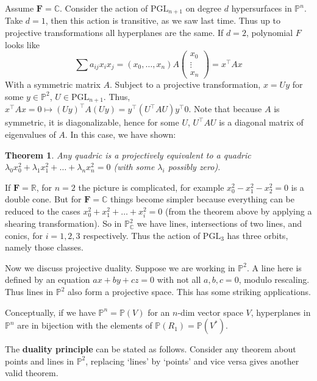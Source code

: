 \documentclass[12pt]{article}
\newcommand{\F}{\mathbf{F}}
\newcommand{\C}{\mathbb{C}}
\newcommand{\R}{\mathbb{R}}
\renewcommand{\P}{\mathbb{P}}
\newcommand{\PGL}{\mathrm{PGL}}
\newtheorem{theorem}{Theorem}[section]
\begin{document}
    Assume $\F = \C$. Consider  the action of $\PGL_{n+1}$ on degree $d$ hypersurfaces in $\P^n$. Take $d = 1$, then this action is transitive, as we saw last time. Thus up to projective transformations all hyperplanes are the same. If $d = 2$, polynomial $F$ looks like
    $$\sum a_{ij} x_i x_j = (x_0, \dots, x_n) A \begin{pmatrix}
        x_0 \\
        \vdots \\
        x_n
    \end{pmatrix} = x^\top A x$$
    With a symmetric matrix $A$. Subject to a projective transformation, $x = Uy$ for some $y \in \P^2$, $U \in \PGL_{n+1}$. Thus, $x^\top A x = 0 \mapsto (Uy)^\top A (Uy) = y^\top (U^\top A U) y^\top 0$. Note that because $A$ is symmetric, it is diagonalizable, hence for some $U$, $U^\top A U$ is a diagonal matrix of eigenvalues of $A$. In this case, we have shown:
    \begin{theorem}
        Any quadric is a projectively equivalent to a quadric $\lambda_0x_0^2 + \lambda_1x_1^2 + \dots + \lambda_nx_n^2 = 0$ (with some $\lambda_i$ possibly zero).
    \end{theorem}
    If $\F = \R$, for $n = 2$ the picture is complicated, for example $x_0^2 - x_1^2 - x_2^2 = 0$ is a double cone. But for $\F = \C$ things become simpler because everything can be reduced to the cases $x_0^2 + x_1^2 + \dots + x_i^2 = 0$ (from the theorem above by applying a shearing transformation). So in $\P_\C^2$ we have lines, intersections of two lines, and conics, for $i = 1, 2, 3$ respectively. Thus the action of $\PGL_3$ has three orbits, namely those classes. \par
    Now we discuss projective duality. Suppose we are working in $\P^2$. A line here is defined by an equation $ax + by + cz = 0$ with not all $a, b, c = 0$, modulo rescaling. Thus lines in $\P^2$ also form a projective space. This has some striking applications. \par
    Conceptually, if we have $\P^n = \P(V)$ for an $n$-dim vector space $V$, hyperplanes in $\P^n$ are in bijection with the elements of $\P(R_1) = \P(V^*)$. \par
    The \textbf{duality principle} can be stated as follows. Consider any theorem about points and lines in $\P^2$, replacing `lines' by `points' and vice versa gives another valid theorem.
\end{document}
